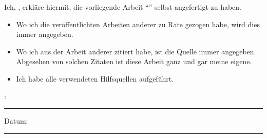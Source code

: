 
\begin{declaration}
    \addchaptertocentry{\authorshipname} %
    \noindent Ich, \authorname, erkläre hiermit, die vorliegende Arbeit \enquote{\ttitle} selbst angefertigt zu haben.
   
    \begin{itemize}
     \item Wo ich die veröffentlichten Arbeiten anderer zu Rate gezogen habe, wird dies immer angegeben.
     \item Wo ich aus der Arbeit anderer zitiert habe, ist die Quelle immer angegeben. Abgesehen von solchen Zitaten ist diese Arbeit ganz und gar meine eigene.
     \item Ich habe alle verwendeten Hilfsquellen aufgeführt.\\
    \end{itemize}
   
   
    \noindent \authorname:\\
    \rule[0.5em]{25em}{0.5pt} %
   
    \noindent Datum:\\
    \rule[0.5em]{25em}{0.5pt} %
    \\
    \\
   
\end{declaration}
